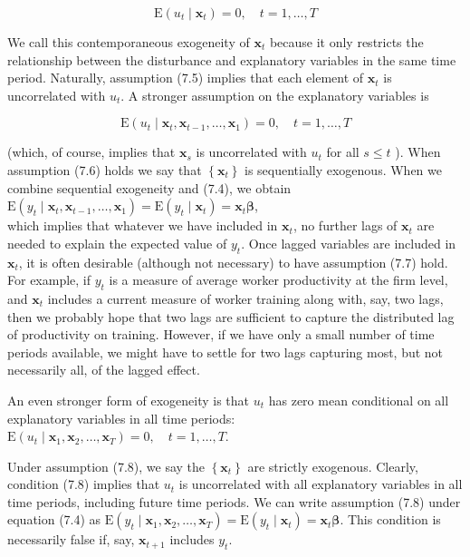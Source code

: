 \documentclass[10pt]{article}
\begin{document}
\begin{equation*}
\mathrm{E}\left(u_{t} \mid \mathbf{x}_{t}\right)=0, \quad t=1, \ldots, T \tag{7.5}
\end{equation*}


We call this contemporaneous exogeneity of $\mathbf{x}_{t}$ because it only restricts the relationship between the disturbance and explanatory variables in the same time period. Naturally, assumption (7.5) implies that each element of $\mathbf{x}_{t}$ is uncorrelated with $u_{t}$. A stronger assumption on the explanatory variables is


\begin{equation*}
\mathrm{E}\left(u_{t} \mid \mathbf{x}_{t}, \mathbf{x}_{t-1}, \ldots, \mathbf{x}_{1}\right)=0, \quad t=1, \ldots, T \tag{7.6}
\end{equation*}


(which, of course, implies that $\mathbf{x}_{s}$ is uncorrelated with $u_{t}$ for all $s \leq t$ ). When assumption (7.6) holds we say that $\left\{\mathbf{x}_{t}\right\}$ is sequentially exogenous. When we combine sequential exogeneity and (7.4), we obtain\\
$\mathrm{E}\left(y_{t} \mid \mathbf{x}_{t}, \mathbf{x}_{t-1}, \ldots, \mathbf{x}_{1}\right)=\mathrm{E}\left(y_{t} \mid \mathbf{x}_{t}\right)=\mathbf{x}_{t} \boldsymbol{\beta}$,\\
which implies that whatever we have included in $\mathbf{x}_{t}$, no further lags of $\mathbf{x}_{t}$ are needed to explain the expected value of $y_{t}$. Once lagged variables are included in $\mathbf{x}_{t}$, it is often desirable (although not necessary) to have assumption (7.7) hold. For example, if $y_{t}$ is a measure of average worker productivity at the firm level, and $\mathbf{x}_{t}$ includes a current measure of worker training along with, say, two lags, then we probably hope that two lags are sufficient to capture the distributed lag of productivity on training. However, if we have only a small number of time periods available, we might have to settle for two lags capturing most, but not necessarily all, of the lagged effect.

An even stronger form of exogeneity is that $u_{t}$ has zero mean conditional on all explanatory variables in all time periods:\\
$\mathrm{E}\left(u_{t} \mid \mathbf{x}_{1}, \mathbf{x}_{2}, \ldots, \mathbf{x}_{T}\right)=0, \quad t=1, \ldots, T$.

Under assumption (7.8), we say the $\left\{\mathbf{x}_{t}\right\}$ are strictly exogenous. Clearly, condition (7.8) implies that $u_{t}$ is uncorrelated with all explanatory variables in all time periods, including future time periods. We can write assumption (7.8) under equation (7.4) as $\mathrm{E}\left(y_{t} \mid \mathbf{x}_{1}, \mathbf{x}_{2}, \ldots, \mathbf{x}_{T}\right)=\mathrm{E}\left(y_{t} \mid \mathbf{x}_{t}\right)=\mathbf{x}_{t} \boldsymbol{\beta}$. This condition is necessarily false if, say, $\mathbf{x}_{t+1}$ includes $y_{t}$.
\end{document}
